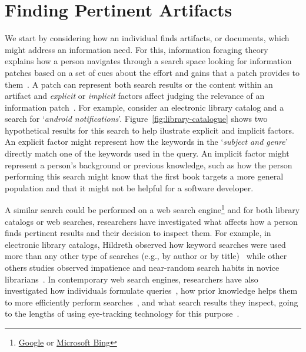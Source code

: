 


\section{Finding Pertinent Artifacts}
\label{cp2:task-approaches}


We start by considering how an individual finds 
artifacts, or documents, which might 
address an information need. 
For this, information foraging theory~\cite{Pirolli1999} explains how a person navigates through  
a search space looking for information patches  based on 
a set of cues about the effort and gains that a patch provides to them~\cite{Pirolli1999}.
A patch can represent both search results or the content within an artifact
and \textit{explicit} or \textit{implicit} factors affect judging the relevance 
of an information patch~\cite{saracevic1975}.
For example,
consider an electronic library catalog and a search for `\textit{android notifications}'.
Figure~\ref{fig:library-catalogue} shows two hypothetical results for this search
to help ilustrate explicit and implicit factors.
An explicit factor might represent how the keywords in the `\textit{subject and genre}' 
directly match one of the keywords used in the query. An implicit factor might represent 
a person's background or previous knowledge, such as how 
the person performing this search 
might know that the first book targets a more general population and 
that it might not be helpful for a software developer.








A similar search could be performed on a web search engine\footnote{\href{https://www.google.com/}{Google} or \href{https://www.bing.com/}{Microsoft Bing}}
and for both library catalogs or web searches, researchers have investigated 
what affects how a person finds pertinent results and their decision to inspect them.
For example, in electronic library catalogs,
Hildreth observed how keyword searches were used more than any other type of searches (e.g., by author or by title)~\cite{hildreth1997}
while other 
others studies observed impatience and near-random search habits in novice librarians~\cite{novotny2004don}.
In contemporary web search engines, researchers have  also 
investigated how individuals formulate queries~\cite{gross2005have, bendersky2012},
how prior knowledge helps them
to more efficiently perform searches~\cite{DeGraaf2014},
and what search results they inspect, going to the lengths
of using eye-tracking technology for this purpose~\cite{Cutrell2007, marcos2015}.




